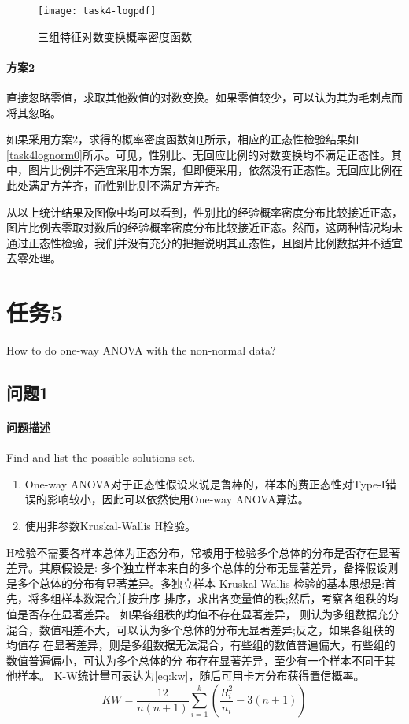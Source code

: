 \documentclass[a4paper,12pt]{article}
\begin{document}
    \begin{figure}
      \centering
      \texttt{[image: task4-logpdf]}
      \caption{三组特征对数变换概率密度函数}
      \label{fig:task4loggnn}
    \end{figure}

    
    \paragraph{方案2} 直接忽略零值，求取其他数值的对数变换。如果零值较少，可以认为其为毛刺点而将其忽略。

    如果采用方案2，求得的概率密度函数如\cref{fig:task4loggnn}所示，相应的正态性检验结果如\cref{task4lognorm0}所示。可见，性别比、无回应比例的对数变换均不满足正态性。其中，图片比例并不适宜采用本方案，但即便采用，依然没有正态性。无回应比例在此处满足方差齐，而性别比则不满足方差齐。

    

    从以上统计结果及图像中均可以看到，性别比的经验概率密度分布比较接近正态，图片比例去零取对数后的经验概率密度分布比较接近正态。然而，这两种情况均未通过正态性检验，我们并没有充分的把握说明其正态性，且图片比例数据并不适宜去零处理。
    \section{任务5} %
    How to do one-way ANOVA with the non-normal data?
    \subsection{问题1} %
    \paragraph{问题描述} Find and list the possible solutions set.
    \begin{enumerate}
      \item One-way ANOVA对于正态性假设来说是鲁棒的，样本的费正态性对Type-I错误的影响较小，因此可以依然使用One-way ANOVA算法。
      \item 使用非参数Kruskal-Wallis H检验。
    \end{enumerate}

    H检验不需要各样本总体为正态分布，常被用于检验多个总体的分布是否存在显著差异。其原假设是: 多个独立样本来自的多个总体的分布无显著差异，备择假设则是多个总体的分布有显著差异。多独立样本 Kruskal-Wallis 检验的基本思想是:首先，将多组样本数混合并按升序 排序，求出各变量值的秩;然后，考察各组秩的均值是否存在显著差异。 如果各组秩的均值不存在显著差异， 则认为多组数据充分混合，数值相差不大，可以认为多个总体的分布无显著差异;反之，如果各组秩的均值存 在显著差异，则是多组数据无法混合，有些组的数值普遍偏大，有些组的数值普遍偏小，可认为多个总体的分 布存在显著差异，至少有一个样本不同于其他样本。\cite{张林泉2014多独立样本}
    K-W统计量可表达为\cref{eq:kw}，随后可用卡方分布获得置信概率。
    \begin{equation}
      \label{eq:kw}
      KW = \frac{12}{n(n+1)}\sum_{i=1}^k{(\frac{R_i^2}{n_i}-3(n+1))}
    \end{equation}
\end{document}

